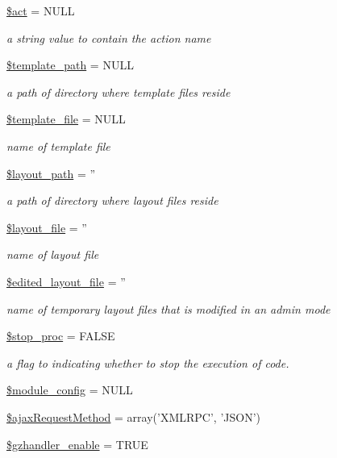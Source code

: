 \begin{DoxyCompactItemize}
\hyperlink{classModuleObject_a9d43905d072c53cd5cd239d706215895}{\$act} = N\-U\-L\-L
\begin{DoxyCompactList}\small\item\em a string value to contain the action name \end{DoxyCompactList}\item 
\hyperlink{classModuleObject_a8a632bae853adef8e2ab9596a3a86661}{\$template\-\_\-path} = N\-U\-L\-L
\begin{DoxyCompactList}\small\item\em a path of directory where template files reside \end{DoxyCompactList}\item 
\hyperlink{classModuleObject_a6eddf08e627527affc7e835a6d302733}{\$template\-\_\-file} = N\-U\-L\-L
\begin{DoxyCompactList}\small\item\em name of template file \end{DoxyCompactList}\item 
\hyperlink{classModuleObject_ada660958e777413d332337fba67d657f}{\$layout\-\_\-path} = ''
\begin{DoxyCompactList}\small\item\em a path of directory where layout files reside \end{DoxyCompactList}\item 
\hyperlink{classModuleObject_a2a1677b06eb7b3ff04ff19e960a64e08}{\$layout\-\_\-file} = ''
\begin{DoxyCompactList}\small\item\em name of layout file \end{DoxyCompactList}\item 
\hyperlink{classModuleObject_a1fcbb01c627ce5ff104c05f54715bd61}{\$edited\-\_\-layout\-\_\-file} = ''
\begin{DoxyCompactList}\small\item\em name of temporary layout files that is modified in an admin mode \end{DoxyCompactList}\item 
\hyperlink{classModuleObject_ad4efa1b4c623247763e4d56f76c5fb1c}{\$stop\-\_\-proc} = F\-A\-L\-S\-E
\begin{DoxyCompactList}\small\item\em a flag to indicating whether to stop the execution of code. \end{DoxyCompactList}\item 
\hyperlink{classModuleObject_aed2cac16f365c2b463772e3eeb0c1402}{\$module\-\_\-config} = N\-U\-L\-L
\item 
\hyperlink{classModuleObject_a783d38cb68310dc6e5a1f6c1cc6c6b84}{\$ajax\-Request\-Method} = array('X\-M\-L\-R\-P\-C', 'J\-S\-O\-N')
\item 
\hyperlink{classModuleObject_acda88247a161a0ddf878e8f504909329}{\$gzhandler\-\_\-enable} = T\-R\-U\-E
\end{DoxyCompactItemize}


